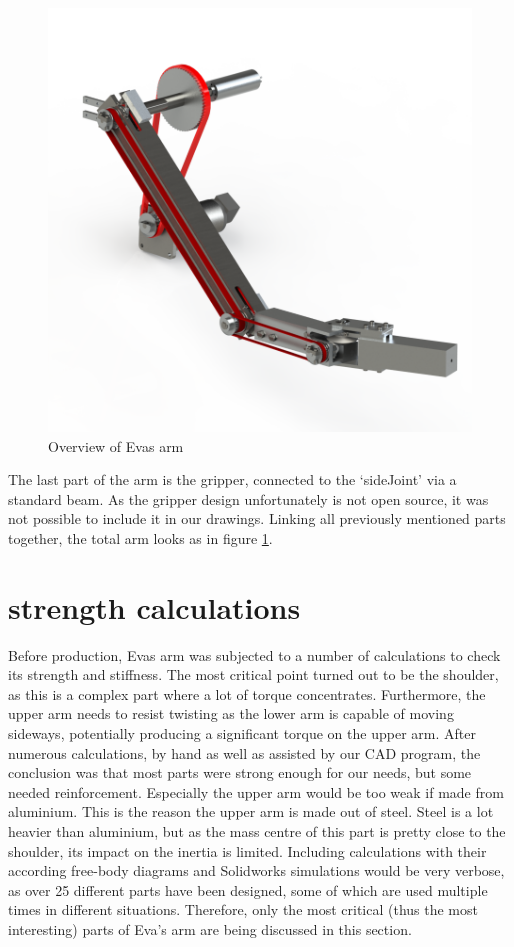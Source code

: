 \documentclass[technical_document.tex]{subfiles}
\begin{document}
\begin{figure}[ht!]
	\centering
	\mbox{\includegraphics[scale=1.0]{Images/overview.png}}
	\caption{Overview of Eva\textquotesingle{}s arm}
	\label{fig:overview}
\end{figure}

The last part of the  arm is the gripper, connected to the ‘sideJoint’ via a standard beam. As the gripper design unfortunately is not open source, it was not possible to include it in our drawings. Linking all previously mentioned parts together, the total arm looks as in figure \ref{fig:overview}.


\section{strength calculations}

Before production, Eva\textquotesingle{}s arm was subjected to a number of calculations to check its strength and stiffness. The most critical point turned out to be the shoulder, as this is a complex part where a lot of torque concentrates. Furthermore, the upper arm needs to resist twisting as the lower arm is capable of moving sideways, potentially producing a significant torque on the upper arm. After numerous calculations, by hand as well as assisted by our CAD program, the conclusion was that most parts were  strong enough for our needs, but some needed reinforcement. Especially the upper arm would be too weak if made from aluminium. This is the reason the upper arm is made out of steel. Steel is a lot heavier than aluminium, but as the mass centre of this part is pretty close to the shoulder, its impact on the inertia is limited.
Including calculations with their according free-body diagrams and Solidworks simulations would be very verbose, as over 25 different parts have been designed, some of which are used multiple times in different situations. Therefore, only the most critical (thus the most interesting) parts of Eva’s arm are being discussed in this section.
\end{document}
